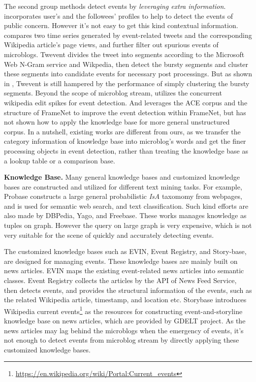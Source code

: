 \documentclass[runningheads,a4paper]{llncs}
\theoremstyle{exampstyle}
\begin{document}
The second group methods detect events by \textit{leveraging extra information}. 
\cite{huang2016efficient} incorporates user's and the followees' profiles to help to detect the events of public concern. 
However it's not easy to get this kind contextual information.
\cite{osborne2012bieber} compares two time series generated by event-related tweets and the corresponding Wikipedia article's page views, and further filter out spurious events of microblogs.
Twevent \cite{Twevent2012} divides the tweet into segments according to the Microsoft Web N-Gram service and Wikpedia, then detect the bursty segments and cluster these segments into candidate events for necessary post processings.
But as shown in \cite{Yan:2015wm}, Twevent is still hampered by the performance of simply clustering the bursty segments.
Beyond the scope of microblog stream, \cite{steiner2013mj} utilizes the concurrent wikipedia edit spikes for event detection.
And \cite{liuleveraging2016} leverages the ACE corpus\cite{doddington2004automatic} and the structure of FrameNet\cite{baker1998berkeley} to improve the event detection within FrameNet, but has not shown how to apply the knowledge base for more general unstructured corpus.
In a nutshell, existing works are different from ours, as we transfer the category information of knowledge base into microblog's words and get the finer processing objects in event detection, rather than treating the knowledge base as a lookup table or a comparison base.

\textbf{Knowledge Base.} Many general knowledge bases and customized knowledge bases are constructed and utilized for different text mining tasks. 
For example, Probase\cite{wu2012probase} constructs a large general probabilistic \textit{IsA} taxomomy from webpages, and is used for semantic web search, and text classification\cite{wang2014concept}.
Such kind efforts are also made by DBPedia\cite{auer2007dbpedia}, Yago\cite{fabian2007yago}, and Freebase\cite{bollacker2008freebase}. 
These works manages knowledge as tuples on graph. 
However the query on large graph is very expensive\cite{huang2011scalable}, which is not very suitable for the scene of quickly and accurately detecting events.

The customized knowledge bases such as EVIN\cite{kuzey2014evin}, Event Registry\cite{leban2014eventRegistry}, and Story-base\cite{wu2015storybase}, are designed for managing events.
These knowledge bases are mainly built on news articles.
EVIN maps the existing event-related news articles into semantic classes. 
Event Registry collects the articles by the API of News Feed Service\cite{trampuvs2012newsfeed}, then detects events, and provides the structural information of the events, such as the related Wikipedia article, timestamp, and location etc. 
Storybase introduces Wikipedia current events\footnote{\url{https://en.wikipedia.org/wiki/Portal:Current_events}} as the resources for constructing event-and-storyline knowledge base on news articles, which are provided by GDELT project\cite{leetaru2013gdelt}.
As the news articles may lag behind the microblogs when the emergency of events, it's not enough to detect events from microblog stream by directly applying these customized knowledge bases. 
\end{document}
